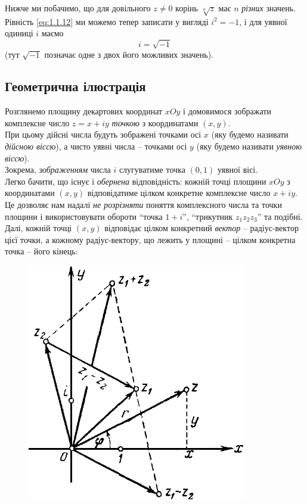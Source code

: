 Нижче ми побачимо, що для довільного $z \ne 0$ корінь $\sqrt[n]{z}$ має $n$ \textit{різних} значень. \\

Рівність \eqref{eq:1.1.12} ми можемо тепер записати у вигляді $i^2 = -1$, і для уявної одиниці $i$ маємо
\begin{equation}
	\label{eq:1.1.17}
	i = \sqrt{-1}
\end{equation}
(тут $\sqrt{-1}$ позначає одне з двох його можливих значень).

\subsection{Геометрична ілюстрація}

Розглянемо площину декартових координат $xOy$ і домовимося зображати комплексне число $z = x + i y$ \textit{точкою} з координатами $(x, y)$. \\

При цьому дійсні числа будуть зображені точками осі $x$ (яку будемо називати \textit{дійсною віссю}), а чисто уявні числа -- точками осі $y$ (яку будемо називати \textit{уявною віссю}). \\

Зокрема, \textit{зображенням} числа $i$ слугуватиме точка $(0, 1)$ уявної вісі. \\

Легко бачити, що існує і \textit{обернена} відповідність: кожній точці площини $xOy$ з координатами $(x,y)$ відповідатиме цілком конкретне комплексне число $x + i y$. \\

Це дозволяє нам надалі \textit{не розрізняти} поняття комплексного числа та точки площини і використовувати обороти ``точка $1+i$'', ``трикутник $z_1z_2z_3$'' та подібні. \\

Далі, кожній точці $(x, y)$ відповідає цілком конкретний \textit{вектор} -- радіус-вектор цієї точки, а кожному радіус-вектору, що лежить у площині -- цілком конкретна точка -- його кінець:

\begin{figure}[H]
	\centering
	\includegraphics[width=.45\linewidth]{mal-01.png}
	\label{fig:1}
\end{figure}

